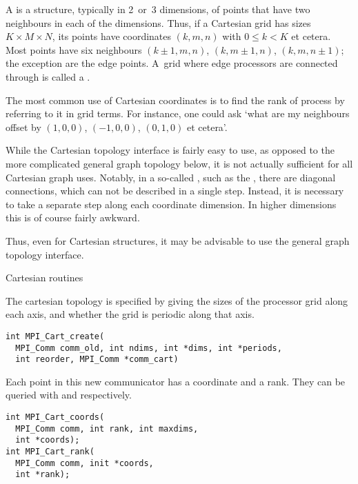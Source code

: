 A  is a structure, typically in 2~or~3 dimensions,
of points that have two neighbours in each of the dimensions.
Thus, if a Cartesian grid has sizes $K\times M\times N$, its
points have coordinates $(k,m,n)$ with $0\leq k<K$ et cetera.
Most points have six neighbours $(k\pm1,m,n)$, $(k,m\pm1,n)$, $(k,m,n\pm1)$;
the exception are the edge points. A~grid where edge processors
are connected through  is called
a .

The most common use of Cartesian coordinates
is to find the rank of process by referring to it in grid terms.
For instance, one could ask `what are my neighbours offset by $(1,0,0)$, 
$(-1,0,0)$, $(0,1,0)$ et cetera'.

While the Cartesian topology interface is fairly easy to use, as
opposed to the more complicated general graph topology below, it is
not actually sufficient for all Cartesian graph uses. Notably, in
a so-called , such as the
, there are diagonal connections,
which can not be described in a single step. Instead, it is necessary
to take a separate step along each coordinate dimension. In higher
dimensions this is of course fairly awkward.

Thus, even for Cartesian structures, it may be advisable to use the
general graph topology interface.

 {Cartesian routines}

The cartesian topology is specified by giving
 the sizes of the processor grid along
each axis, and whether the grid is periodic along that axis.

\lstset{style=reviewcode,language=C} %
\begin{lstlisting}
int MPI_Cart_create(
  MPI_Comm comm_old, int ndims, int *dims, int *periods, 
  int reorder, MPI_Comm *comm_cart)
\end{lstlisting}

Each point in this new communicator has a coordinate and a rank.  They
can be queried with  and
 respectively.

\lstset{style=reviewcode,language=C} %
\begin{lstlisting}
int MPI_Cart_coords(
  MPI_Comm comm, int rank, int maxdims,
  int *coords);
int MPI_Cart_rank(
  MPI_Comm comm, init *coords, 
  int *rank);
\end{lstlisting}

